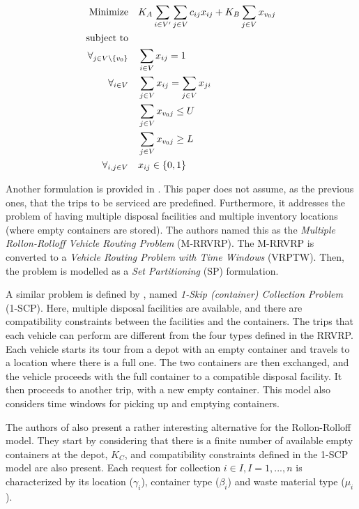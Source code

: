 \begin{align}
	\mbox{Minimize} & \quad K_A \sum_{i \in V^\prime} \sum_{j \in V} c_{ij} x_{ij} +
				K_B \sum_{j \in V} x_{v_0j}
	\\
	\mbox{subject to} & \notag{}
	\\
	\forall_{j \in V \setminus \{v_0\}} & \quad \sum_{i \in V} x_{ij} = 1
	\label{avrp:indegree}
	\\
	\forall_{i \in V} & \quad \sum_{j \in V} x_{ij} = \sum_{j \in V} x_{ji}
	\label{avrp:in-out}
	\\
	& \quad \sum_{j \in V} x_{v_0j} \leq U \label{avrp:upper-k} \\
	& \quad \sum_{j \in V} x_{v_0j} \geq L \label{avrp:lower-k} \\
	\forall_{i, j \in V} & \quad x_{ij} \in \{0, 1\}
\end{align}

Another formulation is provided in \citet{Baldacci06}. This paper does not
assume, as the previous ones, that the trips to be serviced are predefined.
Furthermore, it addresses the problem of having multiple disposal facilities
and multiple inventory locations (where empty containers are stored). The
authors named this as the \textit{Multiple Rollon-Rolloff Vehicle Routing
Problem} (M-RRVRP). The M-RRVRP is converted to a \textit{Vehicle Routing
Problem with Time Windows} (VRPTW). Then, the problem is modelled as a
\textit{Set Partitioning} (SP) formulation.

A similar problem is defined by \citet{Archetti05}, named \textit{1-Skip
(container) Collection Problem} (1-SCP). Here, multiple disposal facilities are
available, and there are compatibility constraints between the facilities and
the containers. The trips that each vehicle can perform are different from the
four types defined in the RRVRP. Each vehicle starts its tour from a depot with
an empty container and travels to a location where there is a full one. The two
containers are then exchanged, and the vehicle proceeds with the full container
to a compatible disposal facility. It then proceeds to another trip, with a new
empty container. This model also considers time windows for picking up and
emptying containers.

The authors of \citet{Aringhieri04} also present a rather interesting
alternative for the Rollon-Rolloff model. They start by considering that
there is a finite number of available empty containers at the depot, $K_C$, and
compatibility constraints defined in the 1-SCP model are also present. Each
request for collection $i \in I, I = {1, ..., n}$ is characterized by its location
($\gamma_i$), container type ($\beta_{i}$) and waste material type ($\mu_i$). 

